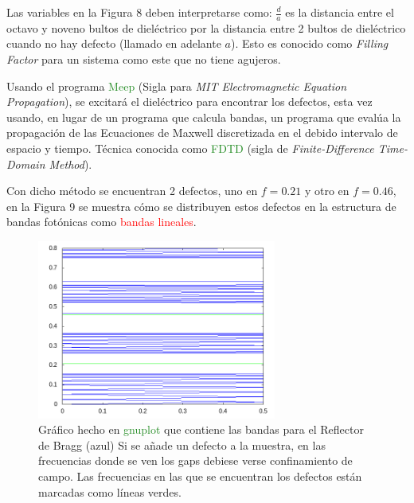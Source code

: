 \documentclass{book}
\begin{document}
Las variables en la Figura 8 deben interpretarse como: $\frac{d}{a}$ es la distancia entre el octavo y noveno bultos de dieléctrico por la distancia entre 2 bultos de dieléctrico cuando no hay defecto (llamado en adelante $a$). Esto es conocido como \textit{Filling Factor} para un sistema como este que no tiene agujeros.
\pagebreak

Usando el programa \textcolor{ForestGreen}{Meep} (Sigla para \textit{MIT Electromagnetic Equation Propagation})\textcolor{red}{\cite{Meep}}, se excitará el dieléctrico para encontrar los defectos, esta vez usando, en lugar de un programa que calcula bandas, un programa que evalúa la propagación de las Ecuaciones de Maxwell discretizada en el debido intervalo de espacio y tiempo. Técnica conocida como \textcolor{ForestGreen}{FDTD} (sigla de \textit{Finite-Difference Time-Domain Method})\textcolor{red}{\cite{Taflove}}.

Con dicho método se encuentran 2 defectos, uno en $f=0.21$ y otro en $f=0.46$, en la Figura 9 se muestra cómo se distribuyen estos defectos en la estructura de bandas fotónicas como \textcolor{red}{bandas lineales}.



\begin{figure}[ht]
 \centering
   \includegraphics[width=0.70\textwidth]{bandef.png}
   \caption{Gráfico hecho en \textcolor{ForestGreen}{gnuplot} que contiene las bandas para el Reflector de Bragg (azul) Si se añade un defecto a la muestra, en las frecuencias donde se ven los gaps debiese verse confinamiento de campo. Las frecuencias en las que se encuentran los defectos están marcadas como líneas verdes. }
\end{figure}

\pagebreak
\end{document}
